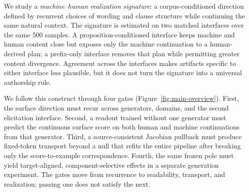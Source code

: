 We study a \emph{machine--human realization signature}: a corpus-conditioned direction defined by recurrent choices of wording and clause structure while continuing the same natural context. The signature is estimated on two matched interfaces over the same 500 samples. A proposition-conditioned interface keeps machine and human content close but exposes only the machine continuation to a human-derived plan; a prefix-only interface removes that plan while permitting greater content divergence. Agreement across the interfaces makes artifacts specific to either interface less plausible, but it does not turn the signature into a universal authorship rule.

We follow this construct through four gates (Figure~\ref{fig:main-overview}). First, the surface direction must recur across generators, domains, and the second elicitation interface. Second, a readout trained without one generator must predict the continuous surface score on both human and machine continuations from that generator. Third, a source-consistent Jacobian pullback must produce fixed-token transport beyond a null that refits the entire pipeline after breaking only the score-to-example correspondence. Fourth, the same frozen pole must yield target-aligned, component-selective effects in a separate generation experiment. The gates move from recurrence to readability, transport, and realization; passing one does not satisfy the next.

